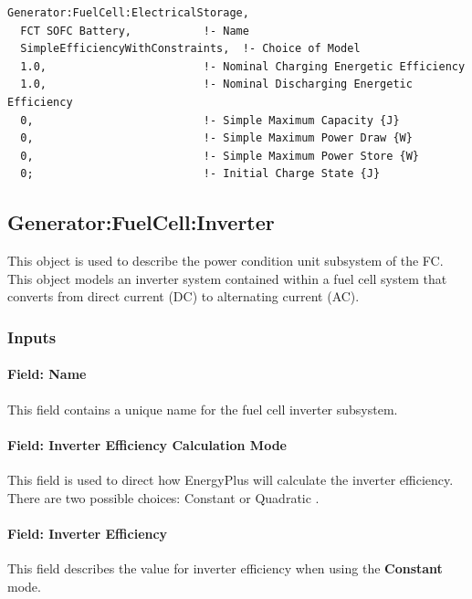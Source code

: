 \begin{lstlisting}
Generator:FuelCell:ElectricalStorage,
  FCT SOFC Battery,           !- Name
  SimpleEfficiencyWithConstraints,  !- Choice of Model
  1.0,                        !- Nominal Charging Energetic Efficiency
  1.0,                        !- Nominal Discharging Energetic Efficiency
  0,                          !- Simple Maximum Capacity {J}
  0,                          !- Simple Maximum Power Draw {W}
  0,                          !- Simple Maximum Power Store {W}
  0;                          !- Initial Charge State {J}
\end{lstlisting}

\subsection{Generator:FuelCell:Inverter}\label{generatorfuelcellinverter}

This object is used to describe the power condition unit subsystem of the FC. This object models an inverter system contained within a fuel cell system that converts from direct current (DC) to alternating current (AC).

\subsubsection{Inputs}\label{inputs-18-000}

\paragraph{Field: Name}\label{field-name-21}

This field contains a unique name for the fuel cell inverter subsystem.

\paragraph{Field: Inverter Efficiency Calculation Mode}\label{field-inverter-efficiency-calculation-mode}

This field is used to direct how EnergyPlus will calculate the inverter efficiency. There are two possible choices: Constant or Quadratic .

\paragraph{Field: Inverter Efficiency}\label{field-inverter-efficiency-1}

This field describes the value for inverter efficiency when using the \textbf{Constant} mode.

